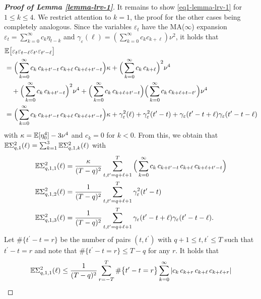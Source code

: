 \begin{proof}[\textnormal{\textbf{Proof of Lemma \ref{lemma-lrv-1}}}]
It remains to show \eqref{eq1-lemma-lrv-1} for $1 \le k \le 4$. We restrict attention to $k=1$, the proof for the other cases being completely analogous. Since the variables $\varepsilon_t$ have the MA($\infty$) expansion $\varepsilon_t = \sum_{k=0}^{\infty} c_k \eta_{t-k}$ and $\gamma_\varepsilon(\ell) = (\sum_{k=0}^\infty c_k c_{k+\ell}) \nu^2$, it holds that 
\begin{align*} 
 & \mathbb{E} \big[ \varepsilon_{t} \varepsilon_{t-\ell} \varepsilon_{t^\prime} \varepsilon_{t^\prime-\ell} \big] \\*
 & = \Big( \sum_{k=0}^{\infty} c_k \, c_{k+t^\prime-t} \, c_{k+\ell} \, c_{k+\ell+t^\prime-t} \Big) \kappa +  \Big( \sum_{k=0}^{\infty} c_k \, c_{k+\ell} \Big)^2 \nu^4 \\*
 & \quad + \Big( \sum_{k=0}^{\infty} c_k \, c_{k+t^\prime-t} \Big)^2 \nu^4 + \Big( \sum_{k=0}^{\infty} c_k \, c_{k+\ell+t^\prime-t} \Big) \Big( \sum_{k=0}^{\infty} c_k \, c_{k+\ell+t-t^\prime} \Big) \nu^4 \\
 & = \Big( \sum_{k=0}^{\infty} c_k \, c_{k+t^\prime-t} \, c_{k+\ell} \, c_{k+\ell+t^\prime-t} \Big) \kappa + \gamma_\varepsilon^2(\ell) + \gamma_\varepsilon^2(t^\prime-t) + \gamma_\varepsilon(t^\prime-t+\ell) \gamma_\varepsilon(t^\prime-t-\ell)
\end{align*}
with $\kappa=\mathbb{E}[\eta_0^4] - 3 \nu^4$ and $c_k=0$ for $k < 0$. From this, we obtain that $\mathbb{E} \Sigma_{q,1}^2(\ell) = \sum_{k=1}^3 \mathbb{E} \Sigma_{q,1,k}^2(\ell)$ with  
\begin{align*}
\mathbb{E} \Sigma_{q,1,1}^2(\ell) & = \frac{\kappa}{(T-q)^2} \sum_{t,t^\prime=q+\ell+1}^T \Big( \sum_{k=0}^{\infty} c_k \, c_{k+t^\prime-t} \, c_{k+\ell} \, c_{k+\ell+t^\prime-t} \Big) \\
\mathbb{E} \Sigma_{q,1,2}^2(\ell) & = \frac{1}{(T-q)^2} \sum_{t,t^\prime=q+\ell+1}^T \gamma_{\varepsilon}^2(t^\prime-t) \\
\mathbb{E} \Sigma_{q,1,3}^2(\ell) & = \frac{1}{(T-q)^2} \sum_{t,t^\prime=q+\ell+1}^T \gamma_{\varepsilon}(t^\prime-t+\ell) \gamma_{\varepsilon}(t^\prime-t-\ell). 
\end{align*}
Let $\# \{ t^\prime - t = r \}$ be the number of pairs $(t,t^\prime)$ with $q+1 \le t,t^\prime \le T$ such that $t^\prime - t = r$ and note that $\# \{ t^\prime - t = r \} \le T-q$ for any $r$. It holds that 
\begin{align}
\ex \Sigma_{q,1,1}^2(\ell) & \le \frac{1}{(T-q)^2} \sum_{r=-T}^T \# \big\{ t^\prime - t = r \big\} \sum_{k=0}^{\infty} | c_k \, c_{k+r} \, c_{k+\ell} \, c_{k+\ell+r} | \nonumber \\

\end{align}
\end{proof}
